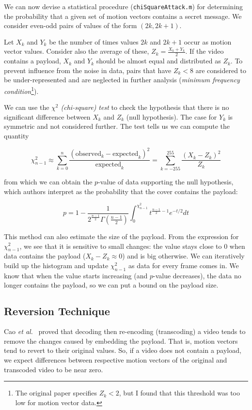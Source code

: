 \documentclass[12pt,british,twoside,notitlepage,usenames,dvipsnames,hypens,final]{report}
\numberwithin{equation}{section}
\numberwithin{figure}{section}
\begin{document}
We can now devise a statistical procedure (\texttt{chiSquareAttack.m}) for determining the probability that a given set of motion vectors contains a secret message. We consider even-odd pairs of values of the form $(2k, 2k+1)$. 

Let $X_k$ and $Y_k$ be the number of times values $2k$ and $2k+1$ occur as motion vector values. Consider also the average of these, $Z_k = \frac{X_k + Y_k}{2}$. If the video contains a payload, $X_k$ and $Y_k$ should be almost equal and distributed as $Z_k$. To prevent influence from the noise in data, pairs that have $Z_k < 8$ are considered to be under-represented and are neglected in further analysis (\emph{minimum frequency condition}\footnote{The original paper specifies $Z_k < 2$, but I found that this threshold was too low for motion vector data.}).

We can use the \emph{$\chi^2$ (chi-square) test} to check the hypothesis that there is no significant difference between $X_k$ and $Z_k$ (null hypothesis). The case for $Y_k$ is symmetric and not considered further. The test tells us we can compute the quantity

$$ \chi^2_{n-1} \approx \sum^{n}_{k=0} \frac{(\text{observed}_k - \text{expected}_k)^2}{\text{expected}_k}= \sum^{255}_{k=-255} \frac{(X_k - Z_k)^2}{Z_k} $$ 

from which we can obtain the $p$-value of data supporting the null hypothesis, which authors interpret as the probability that the cover contains the payload:

$$ p = 1 - \frac{1}{2^{\frac{n-1}{2}}\Gamma(\frac{n-1}{2})}\int_0^{\chi^2_{n-1}}t^{\frac{n-1}{2}−1}e^{-t/2}dt $$  

This method can also estimate the size of the payload. From the expression for $\chi^2_{n-1}$, we see that it is sensitive to small changes: the value stays close to 0 when data contains the payload ($X_k - Z_k \approx 0$) and is big otherwise. We can iteratively build up the histogram and update $\chi^2_{n-1}$ as data for every frame comes in. We know that when the value starts increasing (and $p$-value decreases), the data no longer contains the payload, so we can put a bound on the payload size. 

\subsection{Reversion Technique}
Cao \emph{et al.}~\cite{cao2012video} proved that decoding then re-encoding (transcoding) a video tends to remove the changes caused by embedding the payload. That is, motion vectors tend to revert to their original values. So, if a video does not contain a payload, we expect differences between respective motion vectors of the original and transcoded video to be near zero.
\end{document}

